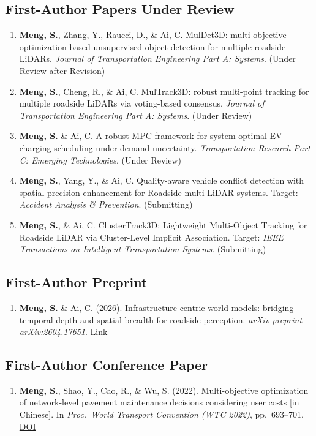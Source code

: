 \documentclass[11pt,a4paper]{article}
\begin{document}
\subsection*{First-Author Papers Under Review}
\begin{enumerate}[leftmargin=1.2em]
    \item \textbf{Meng, S.}, Zhang, Y., Raucci, D., \& Ai, C. MulDet3D: multi-objective optimization based unsupervised object detection for multiple roadside LiDARs. \textit{Journal of Transportation Engineering Part A: Systems}. (Under Review after Revision)
    \item \textbf{Meng, S.}, Cheng, R., \& Ai, C. MulTrack3D: robust multi-point tracking for multiple roadside LiDARs via voting-based consensus. \textit{Journal of Transportation Engineering Part A: Systems}. (Under Review)
    \item \textbf{Meng, S.} \& Ai, C. A robust MPC framework for system-optimal EV charging scheduling under demand uncertainty. \textit{Transportation Research Part C: Emerging Technologies}. (Under Review)
    \item \textbf{Meng, S.}, Yang, Y., \& Ai, C. Quality-aware vehicle conflict detection with spatial precision enhancement for Roadside multi-LiDAR systems. Target: \textit{Accident Analysis \& Prevention}. (Submitting)
    \item \textbf{Meng, S.}, \& Ai, C. ClusterTrack3D: Lightweight Multi-Object Tracking for Roadside LiDAR via Cluster-Level Implicit Association. Target: \textit{IEEE Transactions on Intelligent Transportation Systems}. (Submitting)
\end{enumerate}

\subsection*{First-Author Preprint}
\begin{enumerate}[leftmargin=1.2em]
    \item \textbf{Meng, S.} \& Ai, C. (2026). Infrastructure-centric world models: bridging temporal depth and spatial breadth for roadside perception. \textit{arXiv preprint arXiv:2604.17651}. \href{https://arxiv.org/abs/2604.17651}{Link}
\end{enumerate}

\subsection*{First-Author Conference Paper}
\begin{enumerate}[leftmargin=1.2em]
    \item \textbf{Meng, S.}, Shao, Y., Cao, R., \& Wu, S. (2022). Multi-objective optimization of network-level pavement maintenance decisions considering user costs [in Chinese]. In \textit{Proc.\ World Transport Convention (WTC 2022)}, pp.\ 693--701. \href{https://doi.org/10.26914/c.cnkihy.2022.019338}{DOI}
\end{enumerate}
\end{document}
